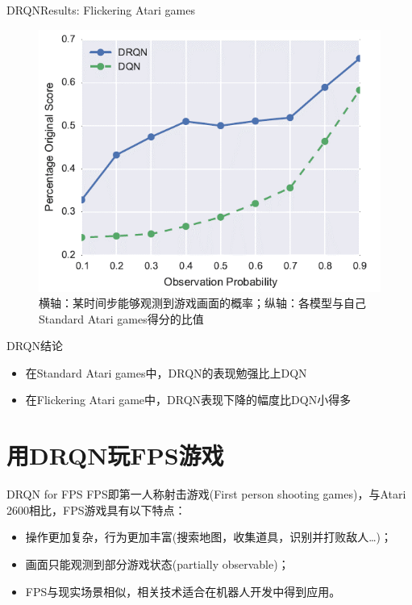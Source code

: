 \documentclass[10pt]{beamer}
\begin{document}
	\begin{frame}{DRQN}{Results: Flickering Atari games}
		\begin{figure}
			\centering
			\includegraphics[width=0.7\linewidth]{pictures/flickering-atari-result}
			\caption{横轴：某时间步能够观测到游戏画面的概率；纵轴：各模型与自己Standard Atari games得分的比值}
			\label{fig:flickering-atari-result}
		\end{figure}
		
	\end{frame}

	\begin{frame}{DRQN}{结论}
		\begin{itemize}
				\item 在Standard Atari games中，DRQN的表现勉强比上DQN
				\item 在Flickering Atari game中，DRQN表现下降的幅度比DQN小得多
		\end{itemize}
	
	\end{frame}
	
	\section{用DRQN玩FPS游戏}

	\begin{frame}{DRQN for FPS}
		FPS即第一人称射击游戏(First person shooting games)，与Atari 2600相比，FPS游戏具有以下特点：
	
		\begin{itemize}
			\item 操作更加复杂，行为更加丰富(搜索地图，收集道具，识别并打败敌人…)；
			\item 画面只能观测到部分游戏状态(partially observable)；
			\item FPS与现实场景相似，相关技术适合在机器人开发中得到应用。
		\end{itemize}
	\end{frame}
\end{document}
